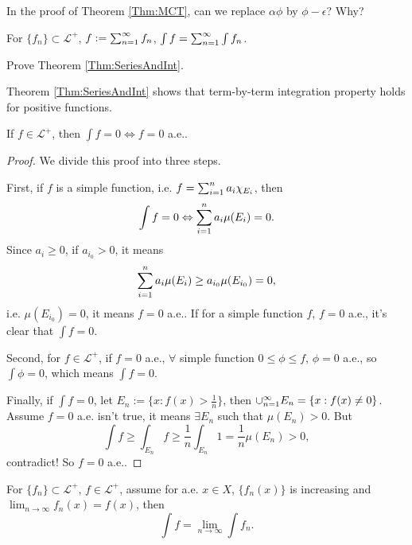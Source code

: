 \begin{exc}
    In the proof of Theorem \ref{Thm:MCT}, 
    can we replace $\alpha\phi$ by $\phi-\epsilon$? 
    Why?
\end{exc}
\begin{thm}
    \label{Thm:SeriesAndInt}
    For $\{f_n\}\subset \mathcal{L}^{+}$, 
    $f:=\sum_{n=1}^{\infty}f_n$, 
    $\int f=\sum_{n=1}^{\infty}\int f_n$.
\end{thm}
\begin{exc}
    Prove Theorem \ref{Thm:SeriesAndInt}.
\end{exc}
\begin{rem}
    Theorem \ref{Thm:SeriesAndInt} shows that 
    term-by-term integration property holds 
    for positive functions.
\end{rem}
\begin{prop}
    \label{Prop:PositiveIntZero}
    If $f\in \mathcal{L}^{+}$, then 
    $\int f=0\Leftrightarrow f=0$ a.e..
\end{prop}
\begin{proof}
    We divide this proof into three steps. 

    First, if $f$ is a simple function, i.e. 
    $f=\sum_{i=1}^{n}a_{i}\chi_{E_i}$, then 
    \begin{displaymath}
        \int f=0\Leftrightarrow
        \sum_{i=1}^{n}a_{i}\mu(E_i)=0.
    \end{displaymath}
    Since $a_{i}\ge 0$, if $a_{i_{0}}>0$, 
    it means 
    \begin{displaymath}
        \sum_{i=1}^{n}a_{i}\mu(E_i)
        \ge a_{i_0}\mu(E_{i_0})=0,
    \end{displaymath}
    i.e. $\mu(E_{i_0})=0$, it means $f=0$ a.e..
    If for a simple function $f$, $f=0$ a.e., it's clear that 
    $\int f=0$.

    Second, for $f\in \mathcal{L}^{+}$, if $f=0$ a.e., 
    $\forall$ simple function $0\le\phi\le f$, 
    $\phi=0$ a.e., so $\int\phi=0$, which means $\int f=0$.

    Finally, if $\int f=0$, let $E_{n}:=\{x:f(x)>\frac{1}{n}\}$, 
    then $\cup_{n=1}^{\infty}E_{n}=\{x:f(x)\neq 0\}$. 
    Assume $f=0$ a.e. isn't true, it means $\exists E_{n}$ 
    such that $\mu(E_n)>0$. 
    But 
    \begin{displaymath}
        \int f\ge\int_{E_n}f\ge\frac{1}{n}\int_{E_n}1
        =\frac{1}{n}\mu(E_n)>0,
    \end{displaymath}
    contradict! So $f=0$ a.e..
\end{proof}
\begin{coro}
    For $\{f_{n}\}\subset\mathcal{L}^{+}$, 
    $f\in\mathcal{L}^{+}$, 
    assume for a.e. $x\in X$, $\{f_{n}(x)\}$ is increasing and 
    $\lim_{n\rightarrow\infty}f_{n}(x)=f(x)$, 
    then 
    \begin{displaymath}
        \int f=\lim_{n\rightarrow\infty}\int f_n.
    \end{displaymath}
\end{coro}
